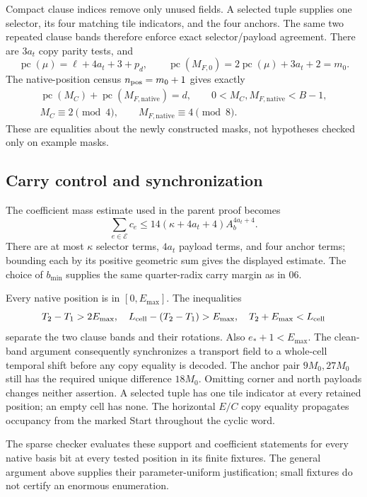 \documentclass[11pt,a4paper]{article}
\theoremstyle{remark}\newtheorem{remark}[theorem]{Remark}
\newcommand{\pc}{\operatorname{pc}}
\begin{document}
Compact clause indices remove only unused fields. A selected tuple
supplies one selector, its four matching tile indicators, and the
four anchors. The same two repeated clause bands therefore enforce
exact selector/payload agreement. There are $3a_t$ copy parity tests,
and
\[
 \pc(\mu)=\ell+4a_t+3+p_d,\qquad
 \pc(M_{F,0})=2\pc(\mu)+3a_t+2=m_0.
\]
The native-position census $n_{\rm pos}=m_0+1$ gives exactly
\begin{equation}
\begin{gathered}
 \pc(M_C)+\pc(M_{F,\mathrm{native}})=d,\qquad
 0<M_C,M_{F,\mathrm{native}}<B-1,\\
 M_C\equiv2\pmod4,\qquad
 M_{F,\mathrm{native}}\equiv4\pmod8.
\end{gathered}\label{eq:maskproperties}
\end{equation}
These are equalities about the newly constructed masks, not
hypotheses checked only on example masks.

\subsection{Carry control and synchronization}

The coefficient mass estimate used in the parent proof becomes
\[
 \sum_{e\in\mathcal E}c_e
 \le14(\kappa+4a_t+4)A_b^{4a_t+4}.
\]
There are at most $\kappa$ selector terms, $4a_t$ payload terms,
and four anchor terms; bounding each by its positive geometric
sum gives the displayed estimate. The choice of $b_{\min}$
supplies the same quarter-radix carry margin as in 06.

Every native position is in $[0,E_{\max}]$. The inequalities
\[
 T_2-T_1>2E_{\max},\quad
 L_{\rm cell}-(T_2-T_1)>E_{\max},\quad
 T_2+E_{\max}<L_{\rm cell}
\]
separate the two clause bands and their rotations. Also $e_*+1<E_{\max}$.
The clean-band argument consequently synchronizes a transport field
to a whole-cell temporal shift before any copy equality is decoded.
The anchor pair $9M_0,27M_0$ still has the required unique difference
$18M_0$. Omitting corner and north payloads changes neither assertion.
A selected tuple has one tile indicator at every retained position;
an empty cell has none. The horizontal $E/C$ copy equality propagates
occupancy from the marked Start throughout the cyclic word.

The sparse checker evaluates these support and coefficient statements
for every native basis bit at every tested position in its finite
fixtures. The general argument above supplies their parameter-uniform
justification; small fixtures do not certify an enormous enumeration.
\end{document}
